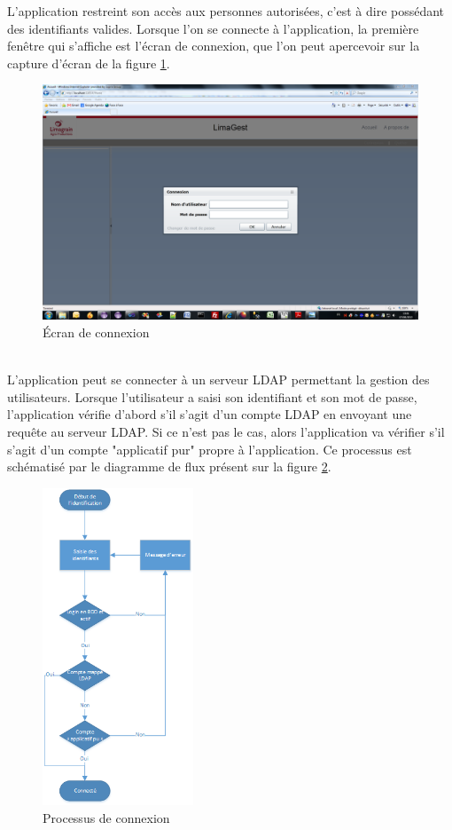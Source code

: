 L'application restreint son accès aux personnes autorisées, c'est à dire possédant des identifiants valides.
Lorsque l'on se connecte à l'application, la première fenêtre qui s'affiche est l'écran de connexion, que l'on peut apercevoir sur la capture d'écran de la figure \ref{connexion_ecran}.
\begin{figure}[!h]
	\center
	\includegraphics[width=1\textwidth]{img/connexion_ecran.png}
	\caption{Écran de connexion}
	\label{connexion_ecran}
\end{figure}
~~\\

L'application peut se connecter à un serveur LDAP permettant la gestion des utilisateurs.
Lorsque l'utilisateur a saisi son identifiant et son mot de passe, l'application vérifie d'abord s'il s'agit d'un compte LDAP en envoyant une requête au serveur LDAP.
Si ce n'est pas le cas, alors l'application va vérifier s'il s'agit d'un compte "applicatif pur" propre à l'application.
Ce processus est schématisé par le diagramme de flux présent sur la figure \ref{connexion_processus}.
\begin{figure}[!h]
	\center
	\includegraphics[width=0.4\textwidth]{img/connexion_processus.png}
	\caption{Processus de connexion}
	\label{connexion_processus}
\end{figure}

